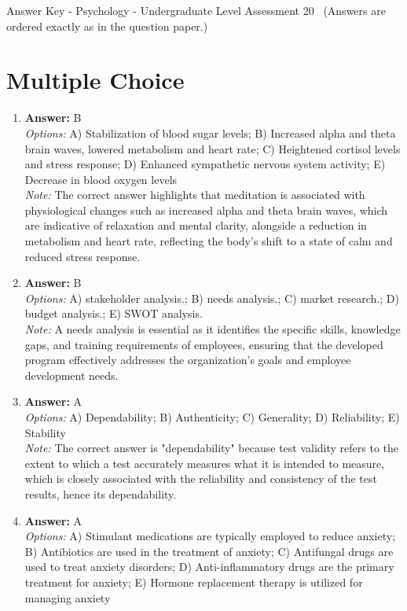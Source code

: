 \documentclass[12pt]{article}
\begin{document}
\begin{center}
Answer Key - Psychology - Undergraduate Level Assessment 20 \
\small (Answers are ordered exactly as in the question paper.)
\end{center}

\section*{Multiple Choice}
\begin{enumerate}[label=\arabic*.]
\item \textbf{Answer:} B
\\ \textit{Options:} A) Stabilization of blood sugar levels; B) Increased alpha and theta brain waves, lowered metabolism and heart rate; C) Heightened cortisol levels and stress response; D) Enhanced sympathetic nervous system activity; E) Decrease in blood oxygen levels
\\ \textit{Note:} The correct answer highlights that meditation is associated with physiological changes such as increased alpha and theta brain waves, which are indicative of relaxation and mental clarity, alongside a reduction in metabolism and heart rate, reflecting the body's shift to a state of calm and reduced stress response.
\item \textbf{Answer:} B
\\ \textit{Options:} A) stakeholder analysis.; B) needs analysis.; C) market research.; D) budget analysis.; E) SWOT analysis.
\\ \textit{Note:} A needs analysis is essential as it identifies the specific skills, knowledge gaps, and training requirements of employees, ensuring that the developed program effectively addresses the organization's goals and employee development needs.
\item \textbf{Answer:} A
\\ \textit{Options:} A) Dependability; B) Authenticity; C) Generality; D) Reliability; E) Stability
\\ \textit{Note:} The correct answer is "dependability" because test validity refers to the extent to which a test accurately measures what it is intended to measure, which is closely associated with the reliability and consistency of the test results, hence its dependability.
\item \textbf{Answer:} A
\\ \textit{Options:} A) Stimulant medications are typically employed to reduce anxiety; B) Antibiotics are used in the treatment of anxiety; C) Antifungal drugs are used to treat anxiety disorders; D) Anti-inflammatory drugs are the primary treatment for anxiety; E) Hormone replacement therapy is utilized for managing anxiety

\end{enumerate}
\end{document}
